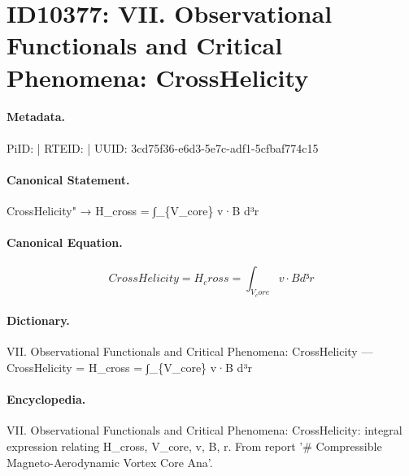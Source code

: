 \section*{ID10377: VII. Observational Functionals and Critical Phenomena: CrossHelicity}
\paragraph{Metadata.}
PiID:  | RTEID:  | UUID: 3cd75f36-e6d3-5e7c-adf1-5cfbaf774c15

\paragraph{Canonical Statement.}
CrossHelicity" → H\_cross = ∫\_\{V\_core\} v·B d³r

\paragraph{Canonical Equation.}
\[
CrossHelicity = H_cross = ∫_{V_core} v·B d³r
\]

\paragraph{Dictionary.}
VII. Observational Functionals and Critical Phenomena: CrossHelicity — CrossHelicity = H\_cross = ∫\_\{V\_core\} v·B d³r

\paragraph{Encyclopedia.}
VII. Observational Functionals and Critical Phenomena: CrossHelicity: integral expression relating H\_cross, V\_core, v, B, r. From report '\# Compressible Magneto-Aerodynamic Vortex Core Ana'.
